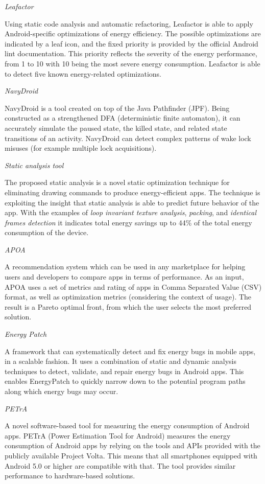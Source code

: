 \documentclass[]{book}
\begin{document}
\emph{Leafactor}

Using static code analysis and automatic refactoring, Leafactor is able
to apply Android-specific optimizations of energy efficiency. The
possible optimizations are indicated by a leaf icon, and the fixed
priority is provided by the official Android lint documentation. This
priority reflects the severity of the energy performance, from 1 to 10
with 10 being the most severe energy consumption. Leafactor is able to
detect five known energy-related optimizations.

\emph{NavyDroid}

NavyDroid is a tool created on top of the Java Pathfinder (JPF). Being
constructed as a strengthened DFA (deterministic finite automaton), it
can accurately simulate the paused state, the killed state, and related
state transitions of an activity. NavyDroid can detect complex patterns
of wake lock misuses (for example multiple lock acquisitions).

\emph{Static analysis tool}

The proposed static analysis is a novel static optimization technique
for eliminating drawing commands to produce energy-efficient apps. The
technique is exploiting the insight that static analysis is able to
predict future behavior of the app. With the examples of \emph{loop
invariant texture analysis}, \emph{packing}, and \emph{identical frames
detection} it indicates total energy savings up to 44\% of the total
energy consumption of the device.

\emph{APOA}

A recommendation system which can be used in any marketplace for helping
users and developers to compare apps in terms of performance. As an
input, APOA uses a set of metrics and rating of apps in Comma Separated
Value (CSV) format, as well as optimization metrics (considering the
context of usage). The result is a Pareto optimal front, from which the
user selects the most preferred solution.

\emph{Energy Patch}

A framework that can systematically detect and fix energy bugs in mobile
apps, in a scalable fashion. It uses a combination of static and dynamic
analysis techniques to detect, validate, and repair energy bugs in
Android apps. This enables EnergyPatch to quickly narrow down to the
potential program paths along which energy bugs may occur.

\emph{PETrA}

A novel software-based tool for measuring the energy consumption of
Android apps. PETrA (Power Estimation Tool for Android) measures the
energy consumption of Android apps by relying on the tools and APIs
provided with the publicly available Project Volta. This means that all
smartphones equipped with Android 5.0 or higher are compatible with
that. The tool provides similar performance to hardware-based solutions.
\end{document}

